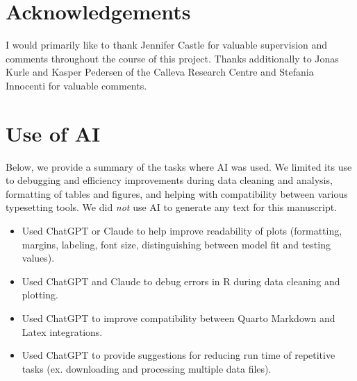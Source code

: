\documentclass[
  10pt,
]{article}
\providecommand{\tightlist}{%
  \setlength{\itemsep}{0pt}\setlength{\parskip}{0pt}}
\begin{document}
\section{Acknowledgements}\label{acknowledgements}

I would primarily like to thank Jennifer Castle for valuable supervision
and comments throughout the course of this project. Thanks additionally
to Jonas Kurle and Kasper Pedersen of the Calleva Research Centre and
Stefania Innocenti for valuable comments.

\section{Use of AI}\label{use-of-ai}

Below, we provide a summary of the tasks where AI was used. We limited
its use to debugging and efficiency improvements during data cleaning
and analysis, formatting of tables and figures, and helping with
compatibility between various typesetting tools. We did \emph{not} use
AI to generate any text for this manuscript.

\begin{itemize}
\tightlist
\item
  Used ChatGPT or Claude to help improve readability of plots
  (formatting, margins, labeling, font size, distinguishing between
  model fit and testing values).
\item
  Used ChatGPT and Claude to debug errors in R during data cleaning and
  plotting.
\item
  Used ChatGPT to improve compatibility between Quarto Markdown and
  Latex integrations.
\item
  Used ChatGPT to provide suggestions for reducing run time of
  repetitive tasks (ex. downloading and processing multiple data files).
\end{itemize}


\printbibliography
\end{document}
